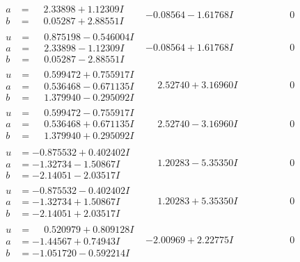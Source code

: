 \documentclass[1p]{elsarticle_modified}
\theoremstyle{definition}
\begin{document}
$$\begin{array}{c|c|c}
\begin{aligned}
a &= \phantom{-}2.33898 + 1.12309 I \\
b &= \phantom{-}0.05287 + 2.88551 I\end{aligned}
 & -0.08564 - 1.61768 I & \phantom{-0.000000 } 0 \\ \hline\begin{aligned}
u &= \phantom{-}0.875198 - 0.546004 I \\
a &= \phantom{-}2.33898 - 1.12309 I \\
b &= \phantom{-}0.05287 - 2.88551 I\end{aligned}
 & -0.08564 + 1.61768 I & \phantom{-0.000000 } 0 \\ \hline\begin{aligned}
u &= \phantom{-}0.599472 + 0.755917 I \\
a &= \phantom{-}0.536468 - 0.671135 I \\
b &= \phantom{-}1.379940 - 0.295092 I\end{aligned}
 & \phantom{-}2.52740 + 3.16960 I & \phantom{-0.000000 } 0 \\ \hline\begin{aligned}
u &= \phantom{-}0.599472 - 0.755917 I \\
a &= \phantom{-}0.536468 + 0.671135 I \\
b &= \phantom{-}1.379940 + 0.295092 I\end{aligned}
 & \phantom{-}2.52740 - 3.16960 I & \phantom{-0.000000 } 0 \\ \hline\begin{aligned}
u &= -0.875532 + 0.402402 I \\
a &= -1.32734 - 1.50867 I \\
b &= -2.14051 - 2.03517 I\end{aligned}
 & \phantom{-}1.20283 - 5.35350 I & \phantom{-0.000000 } 0 \\ \hline\begin{aligned}
u &= -0.875532 - 0.402402 I \\
a &= -1.32734 + 1.50867 I \\
b &= -2.14051 + 2.03517 I\end{aligned}
 & \phantom{-}1.20283 + 5.35350 I & \phantom{-0.000000 } 0 \\ \hline\begin{aligned}
u &= \phantom{-}0.520979 + 0.809128 I \\
a &= -1.44567 + 0.74943 I \\
b &= -1.051720 - 0.592214 I\end{aligned}
 & -2.00969 + 2.22775 I & \phantom{-0.000000 } 0 \\ \hline\begin{aligned}

\end{aligned}
\end{array}$$
\end{document}
